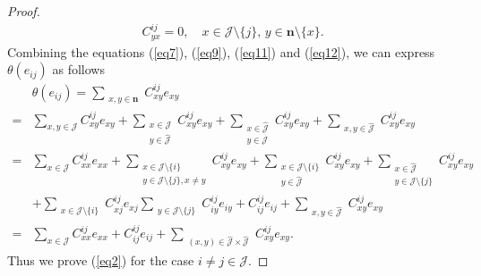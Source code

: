 \documentclass[10pt,a4paper]{amsart}
\begin{document}
\begin{proof}
 \begin{align}\label{eq12}
C_{yx}^{ij} = 0, \quad x \in \mathcal{J} \setminus \{j\}, \, y \in \mathbf{n} \setminus \{x\}.
\end{align}
Combining the equations (\ref{eq7}), (\ref{eq9}), (\ref{eq11}) and (\ref{eq12}), we can express $\theta(e_{ij})$ as follows
\[
\begin{aligned}
&\theta(e_{ij})=\sum_{\substack{x,y \in \mathbf{n}}} C_{xy}^{ij} e_{xy}\\
=& \sum_{x,y \in \mathcal{J}} C_{xy}^{ij} e_{xy} + \sum_{\substack{x \in \mathcal{J} \\ y \in \hat{\mathcal{J}}}} C_{xy}^{ij} e_{xy} + \sum_{\substack{x \in \hat{\mathcal{J}} \\ y \in \mathcal{J}}} C_{xy}^{ij} e_{xy} + \sum_{\substack{x,y \in \hat{\mathcal{J}}}} C_{xy}^{ij} e_{xy} \\
=& \sum_{x \in \mathcal{J}} C_{xx}^{ij} e_{xx} +\sum_{\substack{x \in \mathcal{J}\setminus \{i\} \\y \in \mathcal{J}\setminus \{j\}, x\neq y }} C_{xy}^{ij} e_{xy} + \sum_{\substack{x \in \mathcal{J}\setminus \{i\} \\y \in \hat{\mathcal{J}} }} C_{xy}^{ij} e_{xy} +
\sum_{\substack{x \in \hat{\mathcal{J}}\\y \in \mathcal{J}\setminus \{j\} }} C_{xy}^{ij} e_{xy} \\
&+\sum_{\substack{x \in \mathcal{J}\setminus \{i\}  }} C_{xj}^{ij} e_{xj}
\sum_{\substack{y \in \mathcal{J}\setminus \{j\} }} C_{iy}^{ij} e_{iy}+C_{ij}^{ij} e_{ij}
+ \sum_{\substack{x,y \in \hat{\mathcal{J}}}} C_{xy}^{ij} e_{xy} \\
=& \sum_{x \in \mathcal{J}} C_{xx}^{ij} e_{xx} + C_{ij}^{ij} e_{ij} + 
 \sum_{\substack{(x,y) \in \hat{\mathcal{J}}\times \hat{\mathcal{J}}}} C_{xy}^{ij} e_{xy}.
\end{aligned}
\]
Thus we prove (\ref{eq2}) for the case $ i \neq j \in \mathcal{J} $.


\end{proof}
\end{document}
